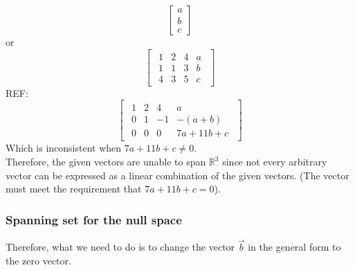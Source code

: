 \documentclass[oneside]{book}
\begin{document}
{\[\begin{bmatrix}
            a\\b\\c
        \end{bmatrix}
    \]
    or
    \[
        \begin{bmatrix}
            \begin{array}{ccc|c}
                1 & 2 & 4 & a\\
                1 & 1 & 3 & b\\
                4 & 3 & 5 & c
            \end{array}
        \end{bmatrix}
    \]
    REF:
    \[
        \begin{bmatrix}
            \begin{array}{ccc|c}
                1 & 2 & 4 & a\\
                0 & 1 & -1 & -(a+b)\\
                0 & 0 & 0 & 7a+11b+c
            \end{array}
        \end{bmatrix}
    \]
    Which is inconsistent when $7a+11b+c \neq 0$.\\
    Therefore, the given vectors are unable to span $\mathbb{R}^3$ since not every arbitrary vector can be expressed as a linear combination of the given vectors. (The vector must meet the requirement that $7a + 11b +c = 0$). 
}


\subsubsection{Spanning set for the null space}
Therefore, what we need to do is to change the vector $\vec{b}$ in the general form to the zero vector. 
\end{document}
